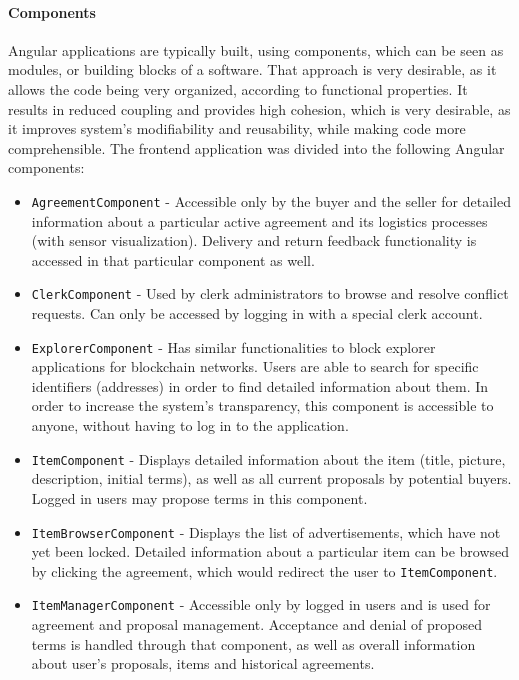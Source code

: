 \paragraph{Components}
Angular applications are typically built, using components, which can be seen as modules, or building blocks of a software. That approach is very desirable, as it allows the code being very organized, according to functional properties. It results in reduced coupling and provides high cohesion, which is very desirable, as it improves system's modifiability and reusability, while making code more comprehensible. The frontend application was divided into the following Angular components:

\begin{itemize}
\item \texttt{AgreementComponent} - Accessible only by the buyer and the seller for detailed information about a particular active agreement and its logistics processes (with sensor visualization). Delivery and return feedback functionality is accessed in that particular component as well. 

\item \texttt{ClerkComponent} - Used by clerk administrators to browse and resolve conflict requests. Can only be accessed by logging in with a special clerk account.

\item \texttt{ExplorerComponent} - Has similar functionalities to block explorer applications for blockchain networks. Users are able to search for specific identifiers (addresses) in order to find detailed information about them. In order to increase the system's transparency, this component is accessible to anyone, without having to log in to the application.

\item \texttt{ItemComponent} - Displays detailed information about the item (title, picture, description, initial terms), as well as all current proposals by potential buyers. Logged in users may propose terms in this component.

\item \texttt{ItemBrowserComponent} - Displays the list of advertisements, which have not yet been locked. Detailed information about a particular item can be browsed by clicking the agreement, which would redirect the user to \texttt{ItemComponent}.

\item \texttt{ItemManagerComponent} - Accessible only by logged in users and is used for agreement and proposal management. Acceptance and denial of proposed terms is handled through that component, as well as overall information about user's proposals, items and historical agreements.


\end{itemize}
